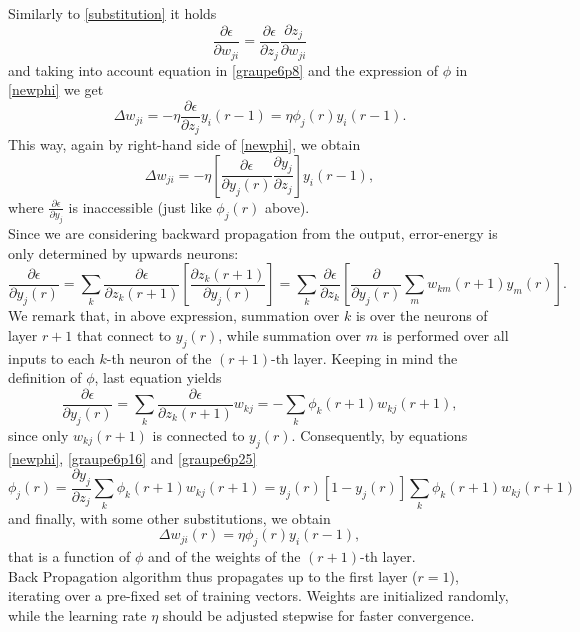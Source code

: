 \documentclass[%
    corpo=11pt,
    twoside,
    stile=classica,
    oldstyle,
    autoretitolo,
    tipotesi=magistrale,
    greek,
    evenboxes,
    english
]{toptesi}
\begin{document}
Similarly to \eqref{substitution} it holds
\begin{equation}
\frac{\partial \epsilon}{\partial w_{ji}} = \frac{\partial \epsilon}{\partial z_j} \frac{\partial z_j}{\partial w_{ji}}
\end{equation}
and taking into account equation in \eqref{graupe6p8} and the expression of $\phi$ in \eqref{newphi} we get
\begin{equation}
\Delta w_{ji} = -\eta \frac{\partial \epsilon}{\partial z_j} y_i (r-1) = \eta \phi_j(r)y_i(r-1).
\end{equation}
This way, again by right-hand side of \eqref{newphi}, we obtain
\begin{equation}
\Delta w_{ji} = -\eta \left[ \frac{\partial \epsilon}{\partial y_j (r)} \frac{\partial y_j}{\partial z_j} \right]y_i(r-1),
\end{equation}
where $\frac{\partial \epsilon}{\partial y_j}$ is inaccessible (just like $\phi_j (r)$ above). \\
Since we are considering backward propagation from the output, error-energy is only determined by upwards neurons:
\begin{equation}
\frac{\partial \epsilon}{\partial y_j (r)} = \sum_k \frac{\partial \epsilon}{\partial z_k (r+1)} \left[\frac{\partial z_k (r+1)}{\partial y_j (r)} \right] = \sum_k \frac{\partial \epsilon}{\partial z_k} \left[ \frac{\partial}{\partial y_j(r)} \sum_m w_{km}(r+1)y_m(r)\right].
\end{equation}
We remark that, in above expression, summation over $k$ is over the neurons of layer $r+1$ that connect to $y_j(r)$, while summation over $m$ is performed over all inputs to each $k$-th neuron of the $(r+1)$-th layer. Keeping in mind the definition of $\phi$, last equation yields
\begin{equation} 
\label{graupe6p25}
\frac{\partial \epsilon}{\partial y_j (r)}  = \sum_k \frac{\partial \epsilon}{\partial z_k (r+1)}w_{kj} = - \sum_k \phi_k(r+1)w_{kj}(r+1),
\end{equation}
since only $w_{kj}(r+1)$ is connected to $y_j(r)$. Consequently, by equations \eqref{newphi}, \eqref{graupe6p16} and \eqref{graupe6p25}
\begin{equation}
\phi_j(r) = \frac{\partial y_j}{\partial z_j}\sum_k \phi_k(r+1)w_{kj}(r +1) = y_j(r)\left[1 -y_j(r)\right]\sum_k \phi_k(r+1)w_{kj}(r +1)
\end{equation}
and finally, with some other substitutions, we obtain
\begin{equation}
\Delta w_{ji}(r) = \eta \phi_j(r)y_i(r-1),
\end{equation}
that is a function of $\phi$ and of the weights of the $(r + 1)$-th layer. \\
Back Propagation algorithm thus propagates up to the first layer ($r = 1$), iterating over a pre-fixed set of training vectors. Weights are initialized randomly, while the learning rate $\eta$ should be adjusted stepwise for faster convergence.
\end{document}
